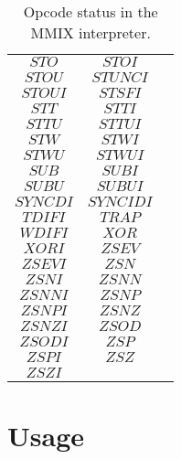 \documentclass[conference]{IEEEtran}
\begin{document}
\begin{table}
\begin{tabular}{cc|c}
$STO$ & $STOI$ & \\
$STOU$ & $STUNCI$ & \\
$STOUI$ & $STSFI$ & \\
$STT$ & $STTI$ & \\
$STTU$ & $STTUI$ & \\
$STW$ & $STWI$ & \\
$STWU$ & $STWUI$ & \\
$SUB$ & $SUBI$ & \\
$SUBU$ & $SUBUI$ & \\
$SYNCDI$ & $SYNCIDI$ & \\
$TDIFI$ & $TRAP$ & \\
$WDIFI$ & $XOR$ & \\
$XORI$ & $ZSEV$ & \\
$ZSEVI$ & $ZSN$ & \\
$ZSNI$ & $ZSNN$ & \\
$ZSNNI$ & $ZSNP$ & \\
$ZSNPI$ & $ZSNZ$ & \\
$ZSNZI$ & $ZSOD$ & \\
$ZSODI$ & $ZSP$ & \\
$ZSPI$ & $ZSZ$ & \\
$ZSZI$ & & \\

\end{tabular}
\vspace{0.1cm}
\caption{Opcode status in the MMIX interpreter.} 
\label{tab:opcodes}
\end{table}


\vspace{0.5cm}
\section{Usage}
\label{sec:usage}
\end{document}
